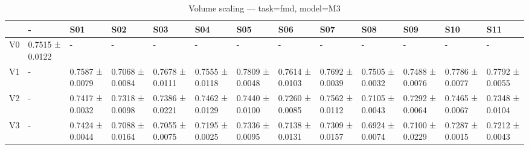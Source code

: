 \begin{table}[htbp]
\centering
\caption{Volume scaling — task=fmd, model=M3}
\label{tab:volume:fmd:M3}
\begin{tabular}{lllllllllllll}
\toprule
\toprule
 & - & S01 & S02 & S03 & S04 & S05 & S06 & S07 & S08 & S09 & S10 & S11 \\
\midrule
\midrule
V0 & 0.7515 ± 0.0122 & - & - & - & - & - & - & - & - & - & - & - \\
V1 & - & 0.7587 ± 0.0079 & 0.7068 ± 0.0084 & 0.7678 ± 0.0111 & 0.7555 ± 0.0118 & 0.7809 ± 0.0048 & 0.7614 ± 0.0103 & 0.7692 ± 0.0039 & 0.7505 ± 0.0032 & 0.7488 ± 0.0076 & 0.7786 ± 0.0077 & 0.7792 ± 0.0055 \\
V2 & - & 0.7417 ± 0.0032 & 0.7318 ± 0.0098 & 0.7386 ± 0.0221 & 0.7462 ± 0.0129 & 0.7440 ± 0.0100 & 0.7260 ± 0.0085 & 0.7562 ± 0.0112 & 0.7105 ± 0.0043 & 0.7292 ± 0.0064 & 0.7465 ± 0.0067 & 0.7348 ± 0.0104 \\
V3 & - & 0.7424 ± 0.0044 & 0.7088 ± 0.0164 & 0.7055 ± 0.0075 & 0.7195 ± 0.0025 & 0.7336 ± 0.0095 & 0.7138 ± 0.0131 & 0.7309 ± 0.0157 & 0.6924 ± 0.0074 & 0.7100 ± 0.0229 & 0.7287 ± 0.0015 & 0.7212 ± 0.0043 \\
\bottomrule
\end{tabular}\end{table}
